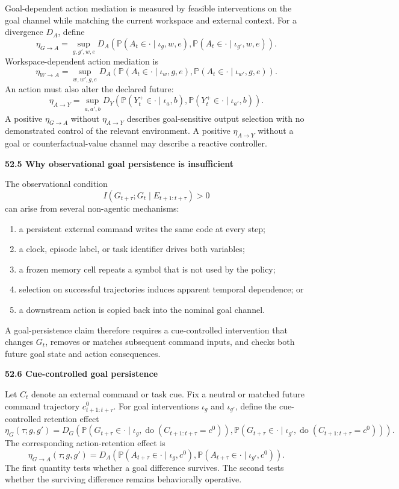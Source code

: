 \documentclass[11pt,letterpaper]{article}
\newcommand{\subtopic}[1]{%
 \vspace{0.45em}
 {\bfseries\color{AccentColor} #1\par}
}
\theoremstyle{plain}
\theoremstyle{definition}
\begin{document}
Goal-dependent action mediation is measured by feasible interventions on the
goal channel while matching the current workspace and external context. For
a divergence \(D_A\), define
\[
\eta_{G\to A}
=
\sup_{g,g',w,e}
D_A
\left(
\mathbb P(A_t\in\cdot\mid\iota_g,w,e),
\mathbb P(A_t\in\cdot\mid\iota_{g'},w,e)
\right).
\]
Workspace-dependent action mediation is
\[
\eta_{W\to A}
=
\sup_{w,w',g,e}
D_A
\left(
\mathbb P(A_t\in\cdot\mid\iota_w,g,e),
\mathbb P(A_t\in\cdot\mid\iota_{w'},g,e)
\right).
\]
An action must also alter the declared future:
\[
\eta_{A\to Y}
=
\sup_{a,a',b}
D_Y
\left(
\mathbb P(Y_t^+\in\cdot\mid\iota_a,b),
\mathbb P(Y_t^+\in\cdot\mid\iota_{a'},b)
\right).
\]
A positive \(\eta_{G\to A}\) without \(\eta_{A\to Y}\) describes goal-sensitive
output selection with no demonstrated control of the relevant environment. A
positive \(\eta_{A\to Y}\) without a goal or counterfactual-value channel may
describe a reactive controller.

\subtopic{52.5 Why observational goal persistence is insufficient}

The observational condition
\[
I(G_{t+\tau};G_t\mid E_{t+1:t+\tau})>0
\]
can arise from several non-agentic mechanisms:
\begin{enumerate}
\item a persistent external command writes the same code at every step;
\item a clock, episode label, or task identifier drives both variables;
\item a frozen memory cell repeats a symbol that is not used by the policy;
\item selection on successful trajectories induces apparent temporal
 dependence; or
\item a downstream action is copied back into the nominal goal channel.
\end{enumerate}
A goal-persistence claim therefore requires a cue-controlled intervention that
changes \(G_t\), removes or matches subsequent command inputs, and checks both
future goal state and action consequences.

\subtopic{52.6 Cue-controlled goal persistence}

Let \(C_t\) denote an external command or task cue. Fix a neutral or matched
future command trajectory \(c_{t+1:t+\tau}^{0}\). For goal interventions
\(\iota_g\) and \(\iota_{g'}\), define the cue-controlled retention effect
\[
\eta_G(\tau;g,g')
=
D_G
\left(
\mathbb P
\left(
G_{t+\tau}\in\cdot
\mid
\iota_g,
\operatorname{do}(C_{t+1:t+\tau}=c^0)
\right),
\mathbb P
\left(
G_{t+\tau}\in\cdot
\mid
\iota_{g'},
\operatorname{do}(C_{t+1:t+\tau}=c^0)
\right)
\right).
\]
The corresponding action-retention effect is
\[
\eta_{G\to A}(\tau;g,g')
=
D_A
\left(
\mathbb P(A_{t+\tau}\in\cdot\mid\iota_g,c^0),
\mathbb P(A_{t+\tau}\in\cdot\mid\iota_{g'},c^0)
\right).
\]
The first quantity tests whether a goal difference survives. The second tests
whether the surviving difference remains behaviorally operative.
\end{document}
